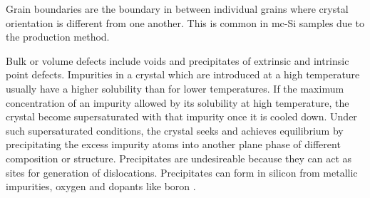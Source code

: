 Grain boundaries are the boundary in between individual grains where crystal orientation is different from one another. This is common in mc-Si samples due to the production method.
     
Bulk or volume defects include voids and precipitates of extrinsic and intrinsic point defects. Impurities in a crystal which are introduced at a high temperature usually have a higher solubility than for lower temperatures. If the maximum concentration of an impurity allowed by its solubility at high temperature, the crystal become supersaturated with that impurity once it is cooled down. Under such supersaturated conditions, the crystal seeks and achieves equilibrium by precipitating the excess impurity atoms into another plane phase of different composition or structure. Precipitates are undesireable because they can act as sites for generation of dislocations. Precipitates can form in silicon from metallic impurities, oxygen and dopants like boron \cite{siliconfareast}.

